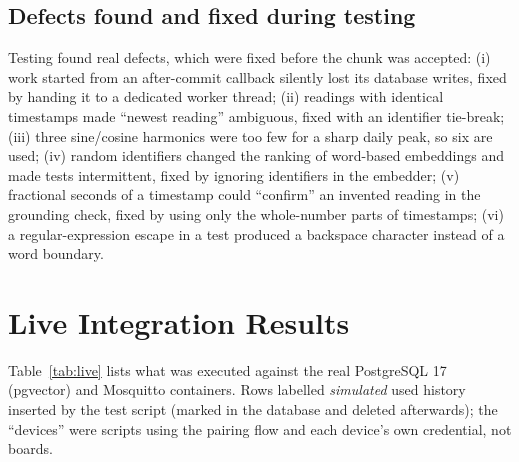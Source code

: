\documentclass[12pt,a4paper,oneside]{report}
\begin{document}
\subsection{Defects found and fixed during testing}
Testing found real defects, which were fixed before the chunk was accepted: (i) work started from an after-commit callback silently lost its database writes, fixed by handing it to a dedicated worker thread; (ii) readings with identical timestamps made ``newest reading'' ambiguous, fixed with an identifier tie-break; (iii) three sine/cosine harmonics were too few for a sharp daily peak, so six are used; (iv) random identifiers changed the ranking of word-based embeddings and made tests intermittent, fixed by ignoring identifiers in the embedder; (v) fractional seconds of a timestamp could ``confirm'' an invented reading in the grounding check, fixed by using only the whole-number parts of timestamps; (vi) a regular-expression escape in a test produced a backspace character instead of a word boundary.

\section{Live Integration Results}
Table~\ref{tab:live} lists what was executed against the real PostgreSQL 17 (pgvector) and Mosquitto containers. Rows labelled \emph{simulated} used history inserted by the test script (marked in the database and deleted afterwards); the ``devices'' were scripts using the pairing flow and each device's own credential, not boards.
\end{document}
